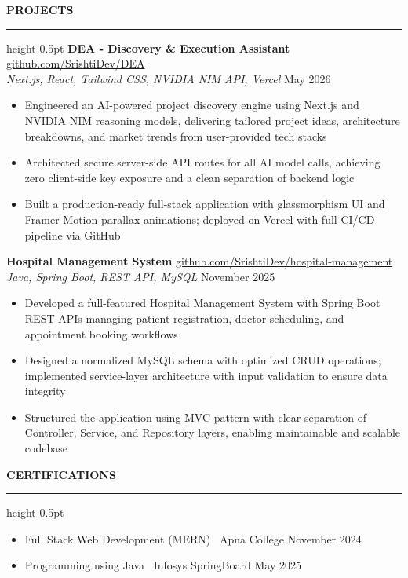 \documentclass[11pt,a4paper]{article}
\newcommand{\sectionheader}[1]{%
    \par\addtolength{\topsep}{0.5\baselineskip}%
    {\large\textbf{\uppercase{#1}}}\par%
    \nopagebreak\vspace{-1em}\nopagebreak\hrule height 0.5pt\endgraf%
    \nopagebreak\vspace{0.25em}\nopagebreak}
\begin{document}
\sectionheader{Projects}
\textbf{DEA - Discovery \& Execution Assistant} \hfill \href{https://github.com/SrishtiDev/DEA}{github.com/SrishtiDev/DEA}\\
\textit{Next.js, React, Tailwind CSS, NVIDIA NIM API, Vercel} \hfill May 2026\\
\begin{itemize}[leftmargin=*,noitemsep,topsep=0pt]
    \item Engineered an AI-powered project discovery engine using Next.js and NVIDIA NIM reasoning models, delivering tailored project ideas, architecture breakdowns, and market trends from user-provided tech stacks
    \item Architected secure server-side API routes for all AI model calls, achieving zero client-side key exposure and a clean separation of backend logic
    \item Built a production-ready full-stack application with glassmorphism UI and Framer Motion parallax animations; deployed on Vercel with full CI/CD pipeline via GitHub
\end{itemize}
\vspace{0.5em}
\textbf{Hospital Management System} \hfill \href{https://github.com/SrishtiDev/hospital-management}{github.com/SrishtiDev/hospital-management}\\
\textit{Java, Spring Boot, REST API, MySQL} \hfill November 2025\\
\begin{itemize}[leftmargin=*,noitemsep,topsep=0pt]
    \item Developed a full-featured Hospital Management System with Spring Boot REST APIs managing patient registration, doctor scheduling, and appointment booking workflows
    \item Designed a normalized MySQL schema with optimized CRUD operations; implemented service-layer architecture with input validation to ensure data integrity
    \item Structured the application using MVC pattern with clear separation of Controller, Service, and Repository layers, enabling maintainable and scalable codebase
\end{itemize}\par

\sectionheader{Certifications}
\begin{itemize}[leftmargin=*,noitemsep,topsep=0pt]
    \item Full Stack Web Development (MERN) \textbar\ Apna College \hfill November 2024
    \item Programming using Java \textbar\ Infosys SpringBoard \hfill May 2025
\end{itemize}\par
\end{document}
